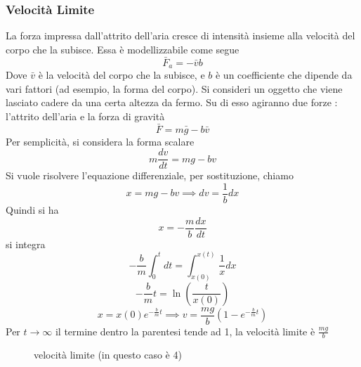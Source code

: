 \documentclass[10pt, letterpaper]{report}
\begin{document}
\subsubsection{Velocità Limite}
La forza impressa dall'attrito dell'aria cresce di intensità insieme alla velocità del corpo che la subisce. Essa 
è modellizzabile come segue $$ \bar F_a=-\bar vb$$
Dove $\bar v$ è la velocità del corpo che la subisce, e $b$ è un coefficiente che dipende da vari fattori (ad esempio, 
la forma del corpo). Si consideri un oggetto che viene lasciato cadere da una certa altezza da fermo. Su di esso 
agiranno due forze : l'attrito dell'aria e la forza di gravità 
$$ \bar F = m\bar g - b\bar v$$
Per semplicità, si considera la forma scalare 
$$ m\frac{dv}{dt}=mg-bv$$
Si vuole risolvere l'equazione differenziale, per sostituzione, chiamo 
$$ x=mg-bv \implies dv=\frac{1}{b}dx$$
Quindi si ha $$ x=-\frac{m}{b}\frac{dx}{dt}$$ si integra 
$$ -\frac{b}{m}\int_0^tdt=\int_{x(0)}^{x(t)}\frac{1}{x}dx$$
$$ -\frac{b}{m}t=\ln(\frac{t}{x(0)})$$
$$ x=x(0)e^{-\frac{b}{m}t}\implies v=\frac{mg}{b}(1-e^{-\frac{b}{m}t})$$
Per $t\rightarrow \infty$ il termine dentro la parentesi tende ad 1, la velocità limite è $\frac{mg}{b}$\begin{figure}[h!]\centering
    \caption{velocità limite (in questo caso è 4)}
\end{figure}
\flowerLine 
\end{document}
